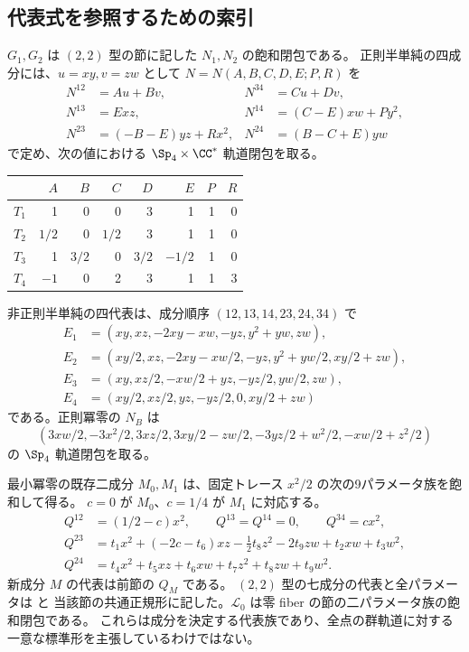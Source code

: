 \subsection{代表式を参照するための索引}
$G_1,G_2$ は $(2,2)$ 型の節に記した $N_1,N_2$ の飽和閉包である。
正則半単純の四成分には、$u=xy,v=zw$ として $N=N(A,B,C,D,E;P,R)$ を
\begin{align*}
 N^{12}&=Au+Bv,& N^{34}&=Cu+Dv,\\
 N^{13}&=Exz,&N^{14}&=(C-E)xw+Py^2,\\
 N^{23}&=(-B-E)yz+Rx^2,&N^{24}&=(B-C+E)yw
\end{align*}
で定め、次の値における $\Sp_4\times\CC^*$ 軌道閉包を取る。
\begin{center}
\begin{tabular}{c|rrrrrrr}
 & $A$&$B$&$C$&$D$&$E$&$P$&$R$\\\hline
$T_1$&1&0&0&3&1&1&0\\
$T_2$&$1/2$&0&$1/2$&3&1&1&0\\
$T_3$&1&$3/2$&0&$3/2$&$-1/2$&1&0\\
$T_4$&$-1$&0&2&3&1&1&3
\end{tabular}
\end{center}
非正則半単純の四代表は、成分順序 $(12,13,14,23,24,34)$ で
\begin{align*}
 E_1&=(xy,xz,-2xy-xw,-yz,y^2+yw,zw),\\
 E_2&=(xy/2,xz,-2xy-xw/2,-yz,y^2+yw/2,xy/2+zw),\\
 E_3&=(xy,xz/2,-xw/2+yz,-yz/2,yw/2,zw),\\
 E_4&=(xy/2,xz/2,yz,-yz/2,0,xy/2+zw)
\end{align*}
である。正則冪零の $N_B$ は
\[
 (3xw/2,-3x^2/2,3xz/2,3xy/2-zw/2,-3yz/2+w^2/2,-xw/2+z^2/2)
\]
の $\Sp_4$ 軌道閉包を取る。

最小冪零の既存二成分 $M_0,M_1$ は、固定トレース $x^2/2$ の次の9パラメータ族を飽和して得る。
$c=0$ が $M_0$、$c=1/4$ が $M_1$ に対応する。
\begin{align*}
 Q^{12}&=(1/2-c)x^2,\qquad Q^{13}=Q^{14}=0,\qquad Q^{34}=cx^2,\\
 Q^{23}&=t_1x^2+(-2c-t_6)xz-\tfrac12t_8z^2-2t_9zw+t_2xw+t_3w^2,\\
 Q^{24}&=t_4x^2+t_5xz+t_6xw+t_7z^2+t_8zw+t_9w^2.
\end{align*}
新成分 $M$ の代表は前節の $Q_M$ である。
$(2,2)$ 型の七成分の代表と全パラメータは  と
当該節の共通正規形に記した。$\mathcal L_0$ は零 fiber の節の二パラメータ族の飽和閉包である。
これらは成分を決定する代表族であり、全点の群軌道に対する一意な標準形を主張しているわけではない。

